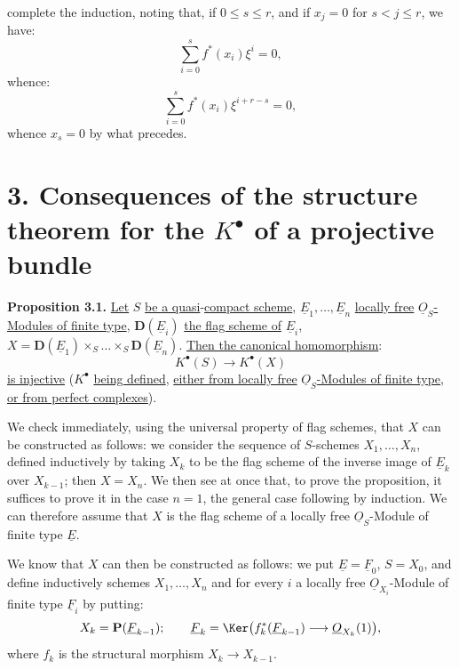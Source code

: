 %
\providecommand{\Sym}{\operatorname{Sym}}
\providecommand{\GL}{\operatorname{GL}}
\providecommand{\Grass}{\operatorname{Grass}}
\providecommand{\gr}{\operatorname{gr}}
\providecommand{\ctop}{c_{\mathrm{top}}}
\providecommand{\Rep}{\operatorname{Rep}}
\providecommand{\RZ}{R_{\mathbb Z}}
\providecommand{\Dflag}{D}
\providecommand{\Gmn}{G}
complete the induction, noting that, if $0\leq s\leq r$, and if $x_j=0$ for $s<j\leq r$, we have:
\[
  \sum_{i=0}^{s}f^*(x_i)\xi^i=0,
\]
whence:
\[
  \sum_{i=0}^{s}f^*(x_i)\xi^{i+r-s}=0,
\]
whence $x_s=0$ by what precedes.

\section*{3. Consequences of the structure theorem for the \(K^{\bullet}\) of a projective bundle}

\textbf{Proposition 3.1.} \uline{Let} \(S\) \uline{be a quasi}-\uline{compact scheme}, \(\underline{E}_1,\ldots,\underline{E}_n\) \uline{locally free} \(\underline{O}_S\)\uline{-Modules of finite type}, \(\mathbf D(\underline{E}_i)\) \uline{the flag scheme of} \(\underline{E}_i\), \(X=\mathbf D(\underline{E}_1)\times_S\ldots\times_S \mathbf D(\underline{E}_n)\).
\uline{Then the canonical homomorphism}:
\[
  K^{\bullet}(S)\longrightarrow K^{\bullet}(X)
\]
\uline{is injective} (\(K^{\bullet}\) \uline{being defined}, \uline{either from locally free} \(\underline{O}_S\)\uline{-Modules of finite type}, \uline{or from perfect complexes}).

We check immediately, using the universal property of flag schemes, that \(X\) can be constructed as follows: we consider the sequence of \(S\)-schemes \(X_1,\ldots,X_n\), defined inductively by taking \(X_k\) to be the flag scheme of the inverse image of \(\underline{E}_k\) over \(X_{k-1}\); then \(X=X_n\). We then see at once that, to prove the proposition, it suffices to prove it in the case \(n=1\), the general case following by induction. We can therefore assume that \(X\) is the flag scheme of a locally free \(\underline{O}_S\)-Module of finite type \(\underline{E}\).

We know that \(X\) can then be constructed as follows: we put \(\underline{E}=\underline{F}_0\), \(S=X_0\), and define inductively schemes \(X_1,\ldots,X_n\) and
%
for every \(i\) a locally free \(\underline{O}_{X_i}\)-Module of finite type \(\underline{F}_i\) by putting:
\[
  X_k=\mathbf P(\underline{F}_{k-1});\qquad
  \underline{F}_k=\Ker\bigl(f_k^*(\underline{F}_{k-1})\longrightarrow \underline{O}_{X_k}(1)\bigr),
\]
where \(f_k\) is the structural morphism \(X_k\to X_{k-1}\).

